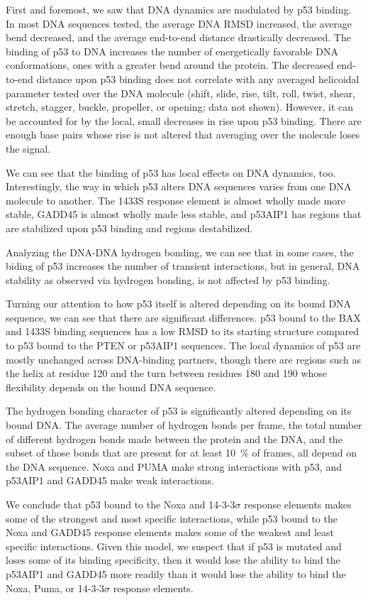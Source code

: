 First and foremost, we saw that DNA dynamics are modulated by p53 binding. In most DNA sequences tested, the average DNA RMSD increased, the average bend decreased, and the average end-to-end distance drastically decreased. The binding of p53 to DNA increases the number of energetically favorable DNA conformations, ones with a greater bend around the protein. The decreased end-to-end distance upon p53 binding does not correlate with any averaged helicoidal parameter tested over the DNA molecule (shift, slide, rise, tilt, roll, twist, shear, stretch, stagger, buckle, propeller, or opening; data not shown). However, it can be accounted for by the local, small decreases in rise upon p53 binding. There are enough base pairs whose rise is not altered that averaging over the molecule loses the signal.

We can see that the binding of p53 has local effects on DNA dynamics, too. Interestingly, the way in which p53 alters DNA sequences varies from one DNA molecule to another. The 1433S response element is almost wholly made more stable, GADD45 is almost wholly made less stable, and p53AIP1 has regions that are stabilized upon p53 binding and regions destabilized.

Analyzing the DNA-DNA hydrogen bonding, we can see that in some cases, the biding of p53 increases the number of transient interactions, but in general, DNA stability as observed via hydrogen bonding, is not affected by p53 binding.

Turning our attention to how p53 itself is altered depending on its bound DNA sequence, we can see that there are significant differences. p53 bound to the BAX and 1433S binding sequences has a low RMSD to its starting structure compared to p53 bound to the PTEN or p53AIP1 sequences. The local dynamics of p53 are mostly unchanged across DNA-binding partners, though there are regions such as the helix at residue \num{120} and the turn between residues \num{180} and \num{190} whose flexibility depends on the bound DNA sequence.

The hydrogen bonding character of p53 is significantly altered depending on its bound DNA. The average number of hydrogen bonds per frame, the total number of different hydrogen bonds made between the protein and the DNA, and the subset of those bonds that are present for at least \qty{10}{\percent} of frames, all depend on the DNA sequence. Noxa and PUMA make strong interactions with p53, and p53AIP1 and GADD45 make weak interactions.

We conclude that p53 bound to the Noxa and 14-3-3\(\sigma\) response elements makes some of the strongest and most specific interactions, while p53 bound to the Noxa and GADD45 response elements makes some of the weakest and least specific interactions. Given this model, we suspect that if p53 is mutated and loses some of its binding specificity, then it would lose the ability to bind the p53AIP1 and GADD45 more readily than it would lose the ability to bind the Noxa, Puma, or 14-3-3\(\sigma\) response elements.

